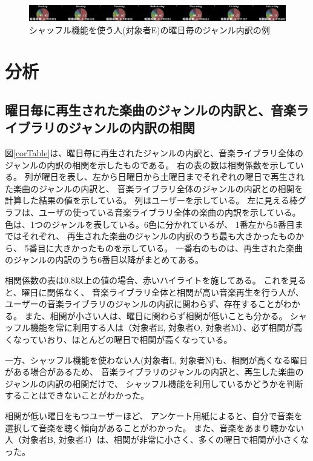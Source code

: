 \documentclass[a4paper, 11pt, onecolumn, report]{jsarticle}
\begin{document}
\begin{figure}[h]
\begin{center}
\includegraphics[width=14cm]{taru_weekGenreRatio.jpg}
\caption{シャッフル機能を使う人(対象者E)の曜日毎のジャンル内訳の例}
\label{weekGenreMap_shuffle}
\end{center}
\end{figure}

\clearpage

\section{分析}
\subsection{曜日毎に再生された楽曲のジャンルの内訳と、音楽ライブラリのジャンルの内訳の相関}
図\ref{corTable}は、曜日毎に再生されたジャンルの内訳と、音楽ライブラリ全体のジャンルの内訳の相関を示したものである。
右の表の数は相関係数を示している。
列が曜日を表し、左から日曜日から土曜日までそれぞれの曜日で再生された楽曲のジャンルの内訳と、
音楽ライブラリ全体のジャンルの内訳との相関を計算した結果の値を示している。
列はユーザーを示している。
左に見える棒グラフは、ユーザの使っている音楽ライブラリ全体の楽曲の内訳を示している。
色は、1つのジャンルを表している。6色に分かれているが、
1番左から5番目まではそれぞれ、
再生された楽曲のジャンルの内訳のうち最も大きかったものから、
5番目に大きかったものを示している。
一番右のものは、再生された楽曲のジャンルの内訳のうち6番目以降がまとめてある。

相関係数の表は0.8以上の値の場合、赤いハイライトを施してある。
これを見ると、曜日に関係なく、
音楽ライブラリ全体と相関が高い音楽再生を行う人が、
ユーザーの音楽ライブラリのジャンルの内訳に関わらず、存在することがわかる。
また、相関が小さい人は、曜日に関わらず相関が低いことも分かる。
シャッフル機能を常に利用する人は（対象者E, 対象者O, 対象者M）、必ず相関が高くなっていおり、ほとんどの曜日で相関が高くなっている。

一方、シャッフル機能を使わない人(対象者L, 対象者N)も、相関が高くなる曜日がある場合があるため、
音楽ライブラリのジャンルの内訳と、再生した楽曲のジャンルの内訳の相関だけで、
シャッフル機能を利用しているかどうかを判断することはできないことがわかった。

相関が低い曜日をもつユーザーほど、
アンケート用紙によると、自分で音楽を選択して音楽を聴く傾向があることがわかった。
また、音楽をあまり聴かない人（対象者B, 対象者J）は、相関が非常に小さく、多くの曜日で相関が小さくなった。
\end{document}
